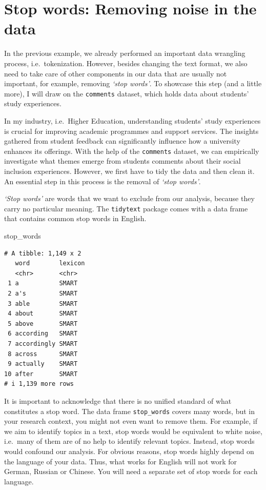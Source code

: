 \documentclass[
  letterpaper,
]{krantz}
\makeatletter
\newenvironment{Shaded}{\begin{snugshade}}{\end{snugshade}}
\newcommand{\NormalTok}[1]{\textcolor[rgb]{0.00,0.23,0.31}{#1}}
\newenvironment{kframe}{%
\medskip{}
\setlength{\fboxsep}{.8em}
 \def\at@end@of@kframe{}%
 \ifinner\ifhmode%
  \def\at@end@of@kframe{\end{minipage}}%
  \begin{minipage}{\columnwidth}%
 \fi\fi%
 \def\FrameCommand##1{\hskip\@totalleftmargin \hskip-\fboxsep
 \colorbox{shadecolor}{##1}\hskip-\fboxsep
     \hskip-\linewidth \hskip-\@totalleftmargin \hskip\columnwidth}%
 \MakeFramed {\advance\hsize-\width
   \@totalleftmargin\z@ \linewidth\hsize
   \@setminipage}}%
 {\par\unskip\endMakeFramed%
 \at@end@of@kframe}
\renewenvironment{Shaded}{\begin{kframe}}{\end{kframe}}
\makeatother
\begin{document}
\section{Stop words: Removing noise in the
data}\label{stop-words-removing-noise-in-the-data}

In the previous example, we already performed an important data
wrangling process, i.e.~tokenization. However, besides changing the text
format, we also need to take care of other components in our data that
are usually not important, for example, removing \emph{`stop words'}. To
showcase this step (and a little more), I will draw on the
\texttt{comments} dataset, which holds data about students' study
experiences.

In my industry, i.e.~Higher Education, understanding students' study
experiences is crucial for improving academic programmes and support
services. The insights gathered from student feedback can significantly
influence how a university enhances its offerings. With the help of the
\texttt{comments} dataset, we can empirically investigate what themes
emerge from students comments about their social inclusion experiences.
However, we first have to tidy the data and then clean it. An essential
step in this process is the removal of \emph{`stop words'}.

\emph{`Stop words'} are words that we want to exclude from our analysis,
because they carry no particular meaning. The \texttt{tidytext} package
comes with a data frame that contains common stop words in English.

\begin{Shaded}
\begin{Highlighting}[]
\NormalTok{stop\_words}
\end{Highlighting}
\end{Shaded}

\begin{verbatim}
# A tibble: 1,149 x 2
   word        lexicon
   <chr>       <chr>  
 1 a           SMART  
 2 a's         SMART  
 3 able        SMART  
 4 about       SMART  
 5 above       SMART  
 6 according   SMART  
 7 accordingly SMART  
 8 across      SMART  
 9 actually    SMART  
10 after       SMART  
# i 1,139 more rows
\end{verbatim}

It is important to acknowledge that there is no unified standard of what
constitutes a stop word. The data frame \texttt{stop\_words} covers many
words, but in your research context, you might not even want to remove
them. For example, if we aim to identify topics in a text, stop words
would be equivalent to white noise, i.e.~many of them are of no help to
identify relevant topics. Instead, stop words would confound our
analysis. For obvious reasons, stop words highly depend on the language
of your data. Thus, what works for English will not work for German,
Russian or Chinese. You will need a separate set of stop words for each
language.
\end{document}
